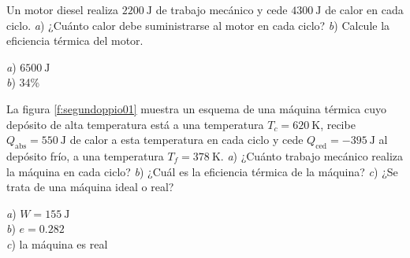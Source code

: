 \setcounter{figure}{0}
%
\begin{Exercise}
  Un motor diesel realiza $\SI{2200}{\joule}$ de trabajo mecánico y cede $\SI{4300}{\joule}$ de calor en cada ciclo. \textit{a}) ¿Cuánto calor debe suministrarse al motor en cada ciclo? \textit{b}) Calcule la eficiencia térmica del motor.
\end{Exercise}
\begin{Answer}
	\begin{minipage}[t]{.4\textwidth}
    \textit{a}) $\SI{6500}{\joule}$\\ \textit{b}) 34\%
  \end{minipage}
\end{Answer}
%
\begin{Exercise}\label{p:segundoppio01}
  {}{}
  La figura \ref{f:segundoppio01} muestra un esquema de una máquina térmica cuyo depósito de alta temperatura está a una temperatura $T_c = \SI{620}{\kelvin}$, recibe $Q_\text{abs} = \SI{550}{\joule}$ de calor a esta temperatura en cada ciclo y cede $Q_\text{ced} = \SI{-395}{\joule}$ al depósito frío, a una temperatura $T_f = \SI{378}{\kelvin}$. \textit{a}) ¿Cuánto trabajo mecánico realiza la máquina en cada ciclo? \textit{b}) ¿Cuál es la eficiencia térmica de la máquina? \textit{c}) ¿Se trata de una máquina ideal o real?
\end{Exercise}
\begin{Answer}
	\begin{minipage}[t]{.4\textwidth}
    \textit{a}) $W = \SI{155}{\joule}$\\ \textit{b}) $e = 0.282$\\ \textit{c}) la máquina es real
  \end{minipage}
\end{Answer}
%
\begin{center}
\end{center}
